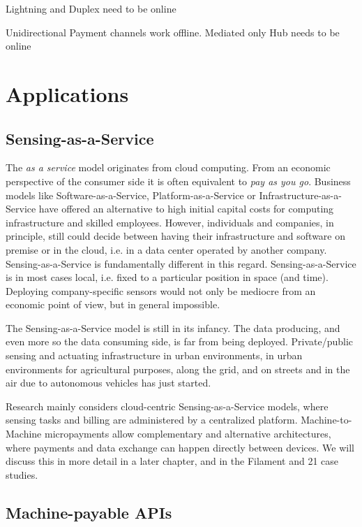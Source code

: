 Lightning and Duplex need to be online 

Unidirectional Payment channels work offline. Mediated only Hub needs to be online 

\section{Applications}

\subsection{Sensing-as-a-Service}
\label{sec:micro:apps:s2aas}

The \emph{as a service} model originates from cloud computing. From an economic perspective of the consumer side it is often equivalent to \emph{pay as you go}. Business models like Software-as-a-Service, Platform-as-a-Service or Infrastructure-as-a-Service have offered an alternative to high initial capital costs for computing infrastructure and skilled employees. However, individuals and companies, in principle, still could decide between having their infrastructure and software on premise or in the cloud, i.e. in a data center operated by another company. Sensing-as-a-Service is fundamentally different in this regard. Sensing-as-a-Service is in most cases local, i.e. fixed to a particular position in space (and time). Deploying company-specific sensors would not only be mediocre from an economic point of view, but in general impossible. 

The Sensing-as-a-Service model is still in its infancy. The data producing, and even more so the data consuming side, is far from being deployed. Private/public sensing and actuating infrastructure in urban environments, in urban environments for agricultural purposes, along the grid, and on streets and in the air due to autonomous vehicles has just started.

Research mainly considers cloud-centric Sensing-as-a-Service models, where sensing tasks and billing are administered by a centralized platform. Machine-to-Machine micropayments allow complementary and alternative architectures, where payments and data exchange can happen directly between devices. We will discuss this in more detail in a later chapter, and in the Filament and 21 case studies.




\subsection{Machine-payable APIs}

